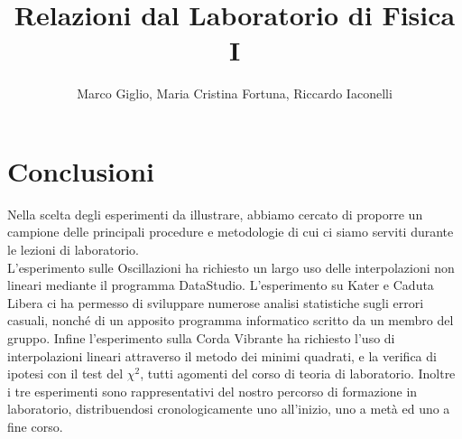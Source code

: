 \documentclass[a4paper,10pt]{report}
\author{Marco Giglio, Maria Cristina Fortuna, Riccardo Iaconelli}
\title{Relazioni dal Laboratorio di Fisica I}
\begin{document}
\maketitle

\tableofcontents

%
%

%
%

%
%

%
\chapter*{Conclusioni}
Nella scelta degli esperimenti da illustrare, abbiamo cercato di proporre un campione delle principali procedure e metodologie di cui ci siamo serviti durante le lezioni di laboratorio.\\
L'esperimento sulle Oscillazioni ha richiesto un largo uso delle interpolazioni non lineari mediante il programma DataStudio.
L'esperimento su Kater e Caduta Libera ci ha permesso di sviluppare numerose analisi statistiche sugli errori casuali, nonché di un apposito programma informatico scritto da un membro del gruppo.
Infine l'esperimento sulla Corda Vibrante ha richiesto l'uso di interpolazioni lineari attraverso il metodo dei minimi quadrati, e la verifica di ipotesi con il test del $\chi^2$, tutti agomenti del corso di teoria di laboratorio.
Inoltre i tre esperimenti sono rappresentativi del nostro percorso di formazione in laboratorio, distribuendosi cronologicamente uno all'inizio, uno a metà ed uno a fine corso.   
\end{document}

